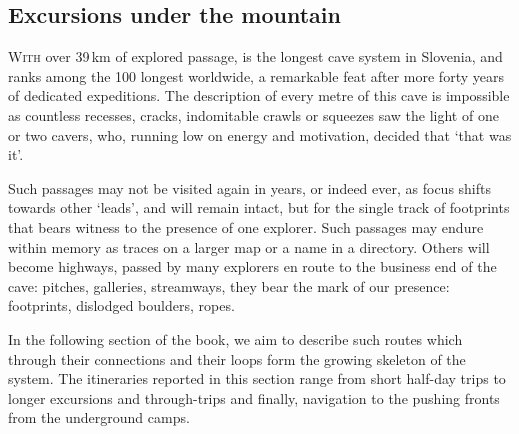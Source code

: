 \begin{tcolorbox}
	\vspace{60pt}
	\part{Excursions under the mountain}
	\lettrine{W}{ith} over 39\,km of explored passage,  is the longest cave system in Slovenia, and ranks among the 100 longest worldwide, a remarkable feat after more forty years of dedicated expeditions. The description of every metre of this cave is impossible as countless recesses, cracks, indomitable crawls or squeezes saw the light of one or two cavers, who, running low on energy and motivation, decided that `that was it'. 

	Such passages may not be visited again in years, or indeed ever, as focus shifts towards other `leads', and will remain intact, but for the single track of footprints that bears witness to the presence of one explorer. Such passages may endure within memory as traces on a larger map or a name in a directory. Others will become highways, passed by many explorers en route to the business end of the cave: pitches, galleries, streamways, they bear the mark of our presence: footprints, dislodged boulders, ropes. 

	In the following section of the book, we aim to describe such routes which through their connections and their loops form the growing skeleton of the system. The itineraries reported in this section range from short half-day trips  to longer excursions and through-trips and finally, navigation to the pushing fronts from the underground camps.
\end{tcolorbox}

